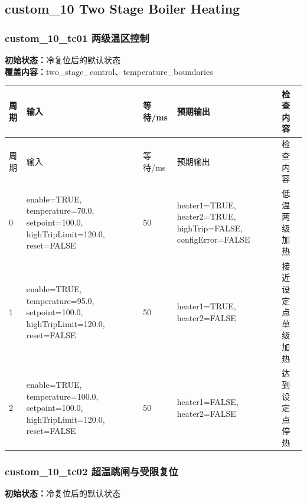 \subsection{{\ttfamily custom\_10} Two Stage Boiler Heating}

\subsubsection{{\ttfamily custom\_10\_tc01} 两级温区控制}

\noindent\textbf{初始状态：}冷复位后的默认状态\\

\textbf{覆盖内容：}two\_stage\_control、temperature\_boundaries

\begin{longtable}{L{1.0cm}L{4.7cm}L{1.4cm}L{4.0cm}L{2.1cm}}

\toprule

周期 & 输入 & 等待/ms & 预期输出 & 检查内容\\

\midrule

\endfirsthead

\toprule

周期 & 输入 & 等待/ms & 预期输出 & 检查内容\\

\midrule

\endhead

0 & enable=TRUE, temperature=70.0, setpoint=100.0, highTripLimit=120.0, reset=FALSE & 50 & heater1=TRUE, heater2=TRUE, highTrip=FALSE, configError=FALSE & 低温两级加热\\

1 & enable=TRUE, temperature=95.0, setpoint=100.0, highTripLimit=120.0, reset=FALSE & 50 & heater1=TRUE, heater2=FALSE & 接近设定点单级加热\\

2 & enable=TRUE, temperature=100.0, setpoint=100.0, highTripLimit=120.0, reset=FALSE & 50 & heater1=FALSE, heater2=FALSE & 达到设定点停热\\

\bottomrule

\end{longtable}

\subsubsection{{\ttfamily custom\_10\_tc02} 超温跳闸与受限复位}

\noindent\textbf{初始状态：}冷复位后的默认状态\\

